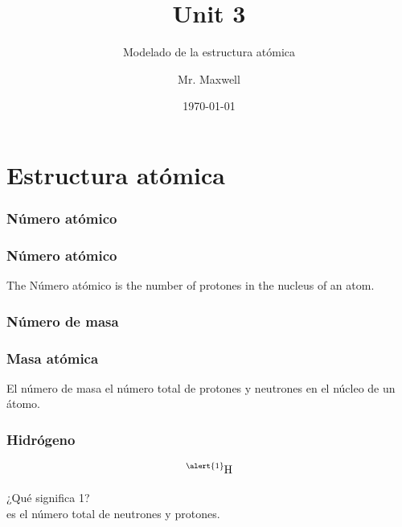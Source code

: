 \documentclass{beamer}
\title{Unit 3}
\subtitle{Modelado de la estructura atómica}
\author{Mr. Maxwell}
\institute{PACS}
\date{\today}
\begin{document}
\frame{\titlepage}
\frame{\tableofcontents}

\section{Estructura atómica}


\subsubsection{Número atómico}

\begin{frame}
    \frametitle{Número atómico}
\onslide The 
 \pause \alert{Número atómico}
 \onslide is the number of 
 \pause \alert{protones} 
 \onslide in the nucleus of an atom.
\end{frame}


\subsubsection{Número de masa}
\begin{frame}
    \frametitle{Masa atómica}
    \onslide El
    \pause \alert{número de masa}
    \onslide el número total de
    \pause \alert{protones}
    \onslide y
    \pause \alert{neutrones}
    \onslide en el núcleo de un átomo.
    \end{frame}



\begin{frame}
    \frametitle{Hidrógeno}
    $$\ce{^{\alert{1}}_{}H}$$

    \pause ¿Qué significa \alert{1}?\\

     es el número total de neutrones y protones.

    \vspace{1cm}



\end{frame}
\end{document}
